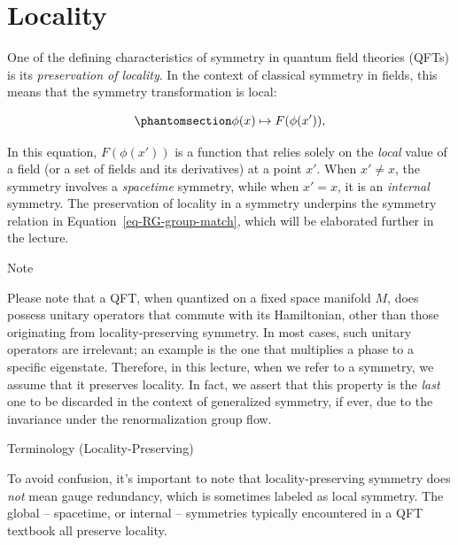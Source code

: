 \documentclass[11pt,toc=bibliography]{scrbook}
\numberwithin{equation}{section}
\begin{document}
\section{Locality}\label{locality}

One of the defining characteristics of symmetry in quantum field
theories (QFTs) is its \emph{preservation of locality}. In the context
of classical symmetry in fields, this means that the symmetry
transformation is local:

\begin{equation}\phantomsection\label{eq-field-transform}{
\phi(x) \mapsto F(\phi(x')),
}\end{equation}

In this equation, \(F(\phi(x'))\) is a function that relies solely on
the \emph{local} value of a field (or a set of fields and its
derivatives) at a point \(x'\). When \(x'\neq x\), the symmetry involves
a \emph{spacetime} symmetry, while when \(x'=x\), it is an
\emph{internal} symmetry. The preservation of locality in a symmetry
underpins the symmetry relation in Equation~\ref{eq-RG-group-match},
which will be elaborated further in the lecture.

\begin{note}{Note}

Please note that a QFT, when quantized on a fixed space manifold \(M\),
does possess unitary operators that commute with its Hamiltonian, other
than those originating from locality-preserving symmetry. In most cases,
such unitary operators are irrelevant; an example is the one that
multiplies a phase to a specific eigenstate. Therefore, in this lecture,
when we refer to a symmetry, we assume that it preserves locality. In
fact, we assert that this property is the \emph{last} one to be
discarded in the context of generalized symmetry, if ever, due to the
invariance under the renormalization group flow. \footnotemark{}

\end{note}


\begin{note}{Terminology (Locality-Preserving)}

To avoid confusion, it's important to note that locality-preserving
symmetry does \emph{not} mean gauge redundancy, which is sometimes
labeled as local symmetry. The global -- spacetime, or internal --
symmetries typically encountered in a QFT textbook all preserve
locality.

\end{note}
\end{document}

